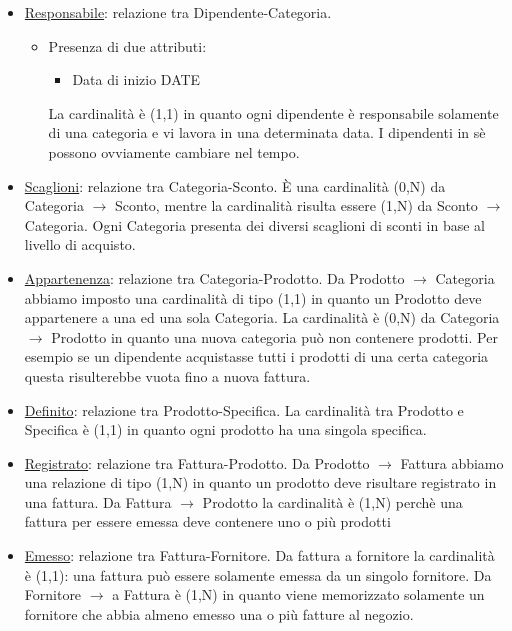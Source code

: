 \begin{itemize}

\item \underline{Responsabile}: relazione tra Dipendente-Categoria.
  \begin{itemize}
  \item Presenza di due attributi:
  \begin{itemize}
  \item Data di inizio DATE
  \end{itemize}
  La cardinalit\`a \`e (1,1) in quanto ogni dipendente \`e responsabile solamente di una categoria e vi lavora in una determinata data. I dipendenti in s\`e possono ovviamente cambiare nel tempo.

  \end{itemize}

\item \underline{Scaglioni}: relazione tra Categoria-Sconto. \`E una cardinalit\`a (0,N) da Categoria $\to$ Sconto, mentre la cardinalit\`a risulta essere (1,N) da Sconto $\to$ Categoria. \newline
Ogni Categoria presenta dei diversi scaglioni di sconti in base al livello di acquisto.

\item \underline{Appartenenza}: relazione tra Categoria-Prodotto. Da Prodotto $\to$ Categoria abbiamo imposto una cardinalit\`a di tipo (1,1) in quanto un Prodotto deve appartenere a una ed una sola Categoria. \newline
  La cardinalit\`a \`e (0,N) da Categoria $\to$ Prodotto in quanto una nuova categoria pu\`o non contenere prodotti.\newline
  Per esempio se un dipendente acquistasse tutti  i prodotti di una certa categoria questa risulterebbe vuota fino a nuova fattura.

\item \underline{Definito}: relazione tra Prodotto-Specifica. La cardinalit\`a tra Prodotto e Specifica \`e (1,1) in quanto ogni prodotto ha una singola specifica.

\item \underline{Registrato}: relazione tra Fattura-Prodotto. Da Prodotto $\to$ Fattura abbiamo una relazione di tipo (1,N) in quanto un prodotto deve risultare registrato in una fattura. \newline
  Da Fattura $\to$ Prodotto la cardinalit\`a \`e (1,N) perch\`e una fattura per essere emessa deve contenere uno o pi\`u prodotti

\item \underline{Emesso}: relazione tra Fattura-Fornitore. Da fattura a fornitore la cardinalit\`a \`e (1,1): una fattura pu\`o essere solamente emessa da un singolo fornitore. \newline
  Da Fornitore $\to$ a Fattura \`e (1,N) in quanto viene memorizzato solamente un fornitore che abbia almeno emesso una o pi\`u fatture al negozio.


\end{itemize}
